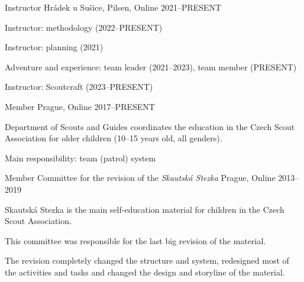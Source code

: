 \begin{cventries}

  \cventry
    {Instructor} %
    {} %
    {Hrádek u Sušice, Pilsen, Online} %
    {2021--PRESENT} %
    {
      \begin{cvitems} %
        \item {Instructor: methodology  (2022--PRESENT)}
        \item {Instructor: planning (2021)}
        \item {Adventure and experience: team leader (2021--2023), team member (PRESENT)}
        \item {Instructor: Scoutcraft (2023--PRESENT)}
      \end{cvitems}
    }

    \cventry
      {Member} %
      {} %
      {Prague, Online} %
      {2017--PRESENT} %
      {
        \begin{cvitems} %
          \item {Department of Scouts and Guides coordinates the education in the Czech Scout Association for older children (10--15 years old, all genders).} 
          \item {Main responsibility: team (patrol) system}
        \end{cvitems}
      }

  \cventry
    {Member} %
    {Committee for the revision of the \emph{Skautská Stezka}} %
    {Prague, Online} %
    {2013--2019} %
    {
      \begin{cvitems} %
        \item {Skautská Stezka is the main self-education material for children in the Czech Scout Association.} 
        \item {This committee was responsible for the last big revision of the material.}
        \item {The revision completely changed the structure and system, redesigned most of the activities and tasks and changed the design and storyline of the material.}
      \end{cvitems}
    }


\end{cventries}
